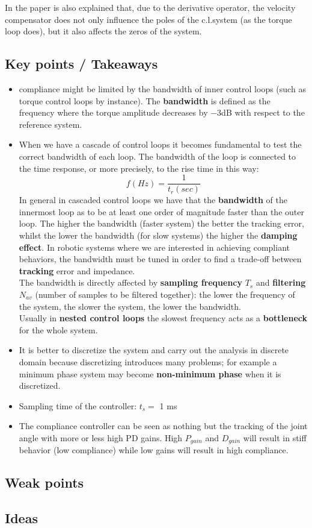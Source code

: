 In the paper is also explained that, due to the derivative operator, the velocity compensator does not only influence the poles of the c.l.system (as the torque loop does), but it also affects the zeros of the system.
\subsection*{Key points / Takeaways}
\begin{itemize}
\item compliance might be limited by the bandwidth of inner control loops (such as torque control loops by instance). The \textbf{bandwidth} is defined as the frequency where the torque amplitude decreases by $-3$dB with respect to the reference system.
\item When we have a cascade of control loops it becomes fundamental to test the correct bandwidth of each loop. The bandwidth of the loop is connected to the time response, or more precisely, to the rise time in this way: $$ f(Hz) = \frac{1}{t_r(sec)}$$
In general in cascaded control loops we have that the \textbf{bandwidth} of the innermost loop as to be at least one order of magnitude faster than the outer loop. The higher the bandwidth (faster system) the better the tracking error, whilst the lower the bandwidth (for slow systems) the higher the \textbf{damping effect}. In robotic systems where we are interested in achieving compliant behaviors, the bandwidth must be tuned in order to find a trade-off between \textbf{tracking} error and impedance.\\
The bandwidth is directly affected by \textbf{sampling frequency} $T_s$ and \textbf{filtering} $N_{av}$ (number of samples to be filtered together): the lower the frequency of the system, the slower the system, the lower the bandwidth.\\
Usually in \textbf{nested control loops} the slowest frequency acts as a \textbf{bottleneck} for the whole system.
\item It is better to discretize the system and carry out the analysis in discrete domain because discretizing introduces many problems; for example a minimum phase system may become \textbf{non-minimum phase} when it is discretized.
\item Sampling time of the controller: $t_s=$ 1 ms
\item The compliance controller can be seen as nothing but the tracking of the joint angle with more or less high PD gains. High $P_{gain}$ and $D_{gain}$ will result in stiff behavior (low compliance) while low gains will result in high compliance.
\end{itemize}
\subsection*{Weak points}
\subsection*{Ideas}
